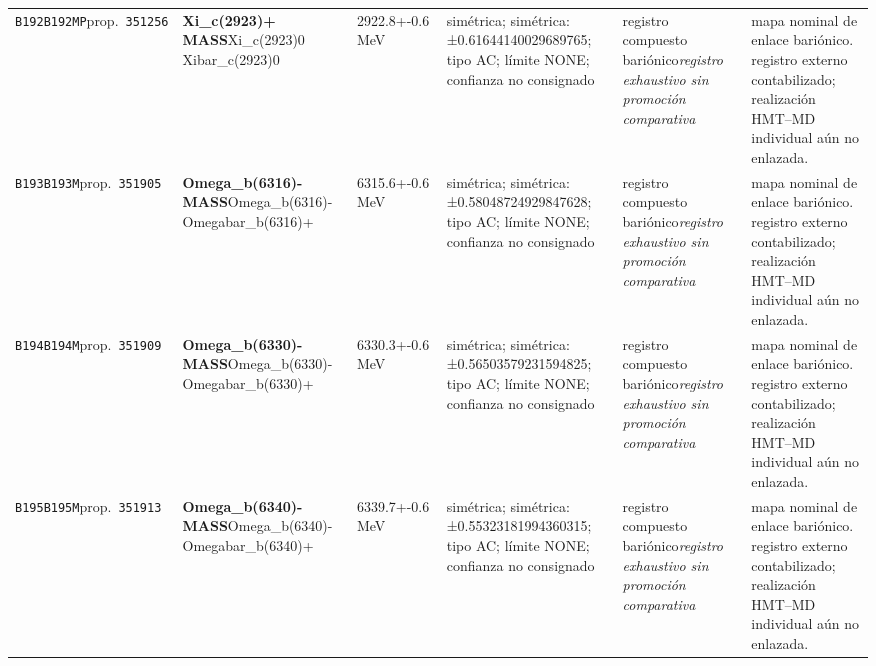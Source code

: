 \begin{landscape}
\begin{longtable}{L{1.85cm}L{4.45cm}L{2.35cm}L{4.05cm}L{3.35cm}L{7.15cm}}
\texttt{B192}\newline \texttt{B192MP}\newline prop.\ \texttt{351256} & \textbf{Xi\_\allowbreak{}c(2923)+ MASS}\newline Xi\_\allowbreak{}c(2923)0 \textbar{}\allowbreak{} Xibar\_\allowbreak{}c(2923)0 & 2922.8+-0.6\,MeV & simétrica; simétrica: ±0.61644140029689765; tipo AC; límite NONE; confianza no consignado & registro compuesto bariónico\newline \emph{registro exhaustivo sin promoción comparativa} & mapa nominal de enlace bariónico. registro externo contabilizado; realización HMT--MD individual aún no enlazada. \\
\texttt{B193}\newline \texttt{B193M}\newline prop.\ \texttt{351905} & \textbf{Omega\_\allowbreak{}b(6316)- MASS}\newline Omega\_\allowbreak{}b(6316)- \textbar{}\allowbreak{} Omegabar\_\allowbreak{}b(6316)+ & 6315.6+-0.6\,MeV & simétrica; simétrica: ±0.58048724929847628; tipo AC; límite NONE; confianza no consignado & registro compuesto bariónico\newline \emph{registro exhaustivo sin promoción comparativa} & mapa nominal de enlace bariónico. registro externo contabilizado; realización HMT--MD individual aún no enlazada. \\
\texttt{B194}\newline \texttt{B194M}\newline prop.\ \texttt{351909} & \textbf{Omega\_\allowbreak{}b(6330)- MASS}\newline Omega\_\allowbreak{}b(6330)- \textbar{}\allowbreak{} Omegabar\_\allowbreak{}b(6330)+ & 6330.3+-0.6\,MeV & simétrica; simétrica: ±0.56503579231594825; tipo AC; límite NONE; confianza no consignado & registro compuesto bariónico\newline \emph{registro exhaustivo sin promoción comparativa} & mapa nominal de enlace bariónico. registro externo contabilizado; realización HMT--MD individual aún no enlazada. \\
\texttt{B195}\newline \texttt{B195M}\newline prop.\ \texttt{351913} & \textbf{Omega\_\allowbreak{}b(6340)- MASS}\newline Omega\_\allowbreak{}b(6340)- \textbar{}\allowbreak{} Omegabar\_\allowbreak{}b(6340)+ & 6339.7+-0.6\,MeV & simétrica; simétrica: ±0.55323181994360315; tipo AC; límite NONE; confianza no consignado & registro compuesto bariónico\newline \emph{registro exhaustivo sin promoción comparativa} & mapa nominal de enlace bariónico. registro externo contabilizado; realización HMT--MD individual aún no enlazada. \\

\end{longtable}
\end{landscape}
